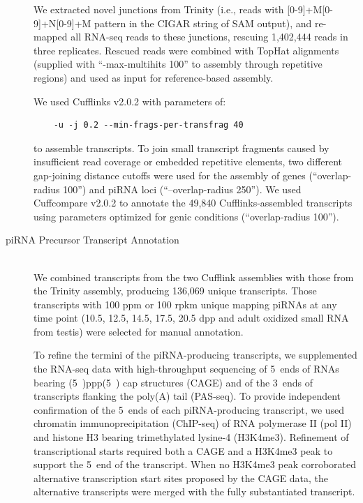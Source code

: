 \begin{description}
    We extracted novel junctions from Trinity (i.e., reads with [0-9]+M[0-9]+N[0-9]+M pattern in the CIGAR string of SAM output), and re-mapped all RNA-seq reads to these junctions, rescuing 1,402,444 reads in three replicates. Rescued reads were combined with TopHat alignments (supplied with ``-max-multihits 100'' to assembly through repetitive regions) and used as input for reference-based assembly.

    We used Cufflinks v2.0.2 \citep{Trapnell2010} with parameters of:
    \lstset{language=BASH}
    \begin{lstlisting}
    -u -j 0.2 --min-frags-per-transfrag 40
    \end{lstlisting}
    to assemble transcripts. To join small transcript fragments caused by insufficient read coverage or embedded repetitive elements, two different gap-joining distance cutoffs were used for the assembly of genes (``\-\-overlap-radius 100'') and piRNA loci (``--overlap-radius 250''). We used Cuffcompare v2.0.2 \citep{Trapnell2010} to annotate the 49,840 Cufflinks-assembled transcripts using parameters optimized for genic conditions (``\-\-overlap-radius 100'').

    \item[piRNA Precursor Transcript Annotation] \hfill \\
    We combined transcripts from the two Cufflink assemblies with those from the Trinity assembly, producing 136,069 unique transcripts. Those transcripts with 100 ppm or 100 rpkm unique mapping piRNAs at any time point (10.5, 12.5, 14.5, 17.5, 20.5 dpp and adult oxidized small RNA from testis) were selected for manual annotation.

    To refine the termini of the piRNA-producing transcripts, we supplemented the RNA-seq data with high-throughput sequencing of 5\textprime~ends of RNAs bearing (5\textprime~)ppp(5\textprime~) cap structures (CAGE) and of the 3\textprime~ends of transcripts flanking the poly(A) tail (PAS-seq). To provide independent confirmation of the 5\textprime~ends of each piRNA-producing transcript, we used chromatin immunoprecipitation (ChIP-seq) of RNA polymerase II (pol II) and histone H3 bearing trimethylated lysine-4 (H3K4me3). Refinement of transcriptional starts required both a CAGE and a H3K4me3 peak to support the 5\textprime~end of the transcript. When no H3K4me3 peak corroborated alternative transcription start sites proposed by the CAGE data, the alternative transcripts were merged with the fully substantiated transcript.


\end{description}
